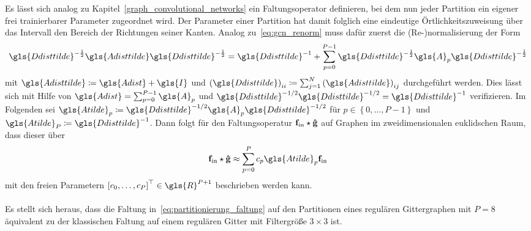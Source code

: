 Es lässt sich analog zu Kapitel~\ref{graph_convolutional_networks} ein Faltungsoperator definieren, bei dem nun jeder Partition ein eigener frei trainierbarer Parameter zugeordnet wird.
Der Parameter einer Partition hat damit folglich eine eindeutige Örtlichkeitszuweisung über das Intervall \bzw{} den Bereich der Richtungen seiner Kanten.
Analog zu~\eqref{eq:gcn_renorm} muss dafür zuerst die (Re-)normalisierung der Form
\begin{equation*}
  \gls{Ddisttilde}^{-\frac{1}{2}}\gls{Adisttilde}\gls{Ddisttilde}^{-\frac{1}{2}} = \gls{Ddisttilde}^{-1} + \sum_{p=0}^{P-1} \gls{Ddisttilde}^{-\frac{1}{2}}\gls{A}_p\gls{Ddisttilde}^{-\frac{1}{2}}
\end{equation*}
mit $\gls{Adisttilde} \coloneqq \gls{Adist} + \gls{I}$ und ${\left(\gls{Ddisttilde}\right)}_{ii} \coloneqq \sum_{j=1}^N {\left(\gls{Adisttilde}\right)}_{ij}$ durchgeführt werden.
Dies lässt sich mit Hilfe von $\gls{Adist} = \sum_{p=0}^{P-1} \gls{A}_p$ und $\gls{Ddisttilde}^{-1/2}\gls{Ddisttilde}^{-1/2} = \gls{Ddisttilde}^{-1}$ verifizieren.
Im Folgenden sei $\gls{Atilde}_p \coloneqq \gls{Ddisttilde}^{-1/2}\gls{A}_p\gls{Ddisttilde}^{-1/2}$ für $p \in \left\{0, \ldots, P-1 \right\}$ und $\gls{Atilde}_P \coloneqq \gls{Ddisttilde}^{-1}$.
Dann folgt für den Faltungsoperatur $\mathbf{f}_{\mathrm{in}} \star \mathbf{\hat g}$ auf Graphen im zweidimensionalen euklidschen Raum, dass dieser über
\begin{equation}
  \ve{f}_{\mathrm{in}} \star \ve{\hat g} \approx \sum_{p=0}^P c_p \gls{Atilde}_p \ve{f}_{\mathrm{in}}
  \label{eq:partitionierung_faltung}
\end{equation}
mit den freien Parametern ${\left[c_0, \ldots, c_P\right]}^{\top} \in \gls{R}^{P+1}$ beschrieben werden kann.
\\\\
Es stellt sich heraus, dass die Faltung in~\eqref{eq:partitionierung_faltung} auf den Partitionen eines regulären Gittergraphen mit $P=8$ äquivalent zu der klassischen Faltung auf einem regulären Gitter mit Filtergröße $3 \times 3$ ist.

